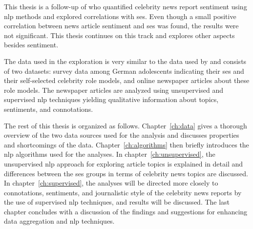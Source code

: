 This thesis is a follow-up of \textcite{fenske_using_2022} who quantified celebrity news report sentiment using \gls{nlp} methods and explored correlations with \gls{ses}. Even though a small positive correlation between news article sentiment and \gls{ses} was found, the results were not significant. This thesis continues on this track and explores other aspects besides sentiment.

The data used in the exploration is very similar to the data used by \textcite{fenske_using_2022} and consists of two datasets: survey data among German adolescents indicating their \gls{ses} and their self-selected celebrity role models, and online newspaper articles about these role models. The newspaper articles are analyzed using unsupervised and supervised \gls{nlp} techniques yielding qualitative information about topics, sentiments, and connotations.

The rest of this thesis is organized as follows. Chapter~\ref{ch:data} gives a thorough overview of the two data sources used for the analysis and discusses properties and shortcomings of the data. Chapter~\ref{ch:algorithms} then briefly introduces the \gls{nlp} algorithms used for the analyses. In chapter~\ref{ch:unsupervised}, the unsupervised \gls{nlp} approach for exploring article topics is explained in detail and differences between the \gls{ses} groups in terms of celebrity news topics are discussed. In chapter~\ref{ch:supervised}, the analyses will be directed more closely to connotations, sentiments, and journalistic style of the celebrity news reports by the use of supervised \gls{nlp} techniques, and results will be discussed. The last chapter concludes with a discussion of the findings and suggestions for enhancing data aggregation and \gls{nlp} techniques.